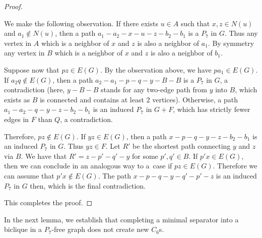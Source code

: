 \documentclass[11pt,a4paper]{article}
\theoremstyle{definition}
\begin{document}
\begin{proof}
\begin{enumerate}
            We make the following observation. If there exists $u\in A$ such that $x,z\in N(u)$ and $a_1\notin N(u)$, then a path $a_1-a_2-x-u-z-b_2-b_1$ is a $P_7$ in $G$. Thus any vertex in $A$ which is a neighbor of $x$ and $z$ is also a neighbor of $a_1$. By symmetry any vertex in $B$ which is a neighbor of $x$ and $z$ is also a neighbor of $b_1$.
            
            Suppose now that $pz\in E(G)$. By the observation above, 
            we have $pa_1\in E(G)$. If $a_2q\notin E(G)$, then a path $a_2-a_1-p-q-y-B-B$ is a $P_7$ in $G$, a contradiction (here, $y-B-B$ stands for any two-edge path from $y$ into $B$, which exists as $B$ is connected and contains at least $2$ vertices). Otherwise, a path $a_1-a_2-q-y-z-b_2-b_1$ is an induced $P_7$ in $G+F$, which has strictly fewer edges in $F$ than $Q$, a contradiction.
            
            Therefore, $pz\notin E(G)$. If $yz\in E(G)$, then a path $x-p-q-y-z-b_2-b_1$ is an induced  $P_7$ in $G$. Thus $yz\in F$. Let $R'$ be the shortest path connecting $y$ and $z$ via $B$. We have that $R' = z-p'-q'-y$ for some $p',q' \in B$.
            If $p'x\in E(G)$, then we can conclude in an analogous way to a~case if $pz\in E(G)$. Therefore we can assume that $p'x\notin E(G)$. The path $x-p-q-y-q'-p'-z$ is an induced $P_7$ in $G$ then, which is the final contradiction. 
        \end{enumerate}
        This completes the proof.
\end{proof}

In the next lemma, we establish that completing a minimal separator into a biclique in a $P_7$-free graph does not create new $C_6$s.
\end{document}
